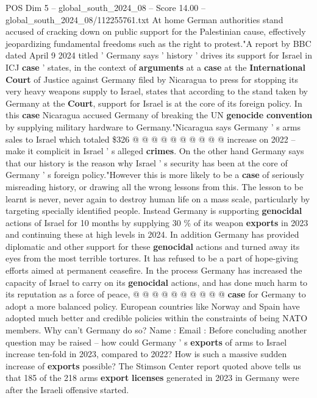 \begin{textsample}{POS Dim 5 – global\_south\_2024\_08 – Score 14.00 – global\_south\_2024\_08/112255761.txt}
At home German authorities stand accused of cracking down on public support for the Palestinian cause, effectively jeopardizing fundamental freedoms such as the right to protest."A report by BBC dated April 9 2024 titled ' Germany says ' history ' drives its support for Israel in ICJ \textbf{case} ' states, in the context of \textbf{arguments} at a \textbf{case} at the \textbf{International} \textbf{Court} of Justice against Germany filed by Nicaragua to press for stopping its very heavy weapons supply to Israel, states that according to the stand taken by Germany at the \textbf{Court}, support for Israel is at the core of its foreign policy.
In this \textbf{case} Nicaragua accused Germany of breaking the UN \textbf{genocide} \textbf{convention} by supplying military hardware to Germany."Nicaragua says Germany ' s arms sales to Israel which totaled \$326 @ @ @ @ @ @ @ @ @ @ increase on 2022 -- make it complicit in Israel ' s alleged \textbf{crimes}.
On the other hand Germany says that our history is the reason why Israel ' s security has been at the core of Germany ' s foreign policy."However this is more likely to be a \textbf{case} of seriously misreading history, or drawing all the wrong lessons from this.
The lesson to be learnt is never, never again to destroy human life on a mass scale, particularly by targeting specially identified people.
Instead Germany is supporting \textbf{genocidal} actions of Israel for 10 months by supplying 30 \% of its weapon \textbf{exports} in 2023 and continuing these at high levels in 2024.
In addition Germany has provided diplomatic and other support for these \textbf{genocidal} actions and turned away its eyes from the most terrible tortures.
It has refused to be a part of hope-giving efforts aimed at permanent ceasefire.
In the process Germany has increased the capacity of Israel to carry on its \textbf{genocidal} actions, and has done much harm to its reputation as a force of peace, @ @ @ @ @ @ @ @ @ @ \textbf{case} for Germany to adopt a more balanced policy.
European countries like Norway and Spain have adopted much better and credible policies within the constraints of being NATO members.
Why can't Germany do so?
Name : Email : Before concluding another question may be raised -- how could Germany ' s \textbf{exports} of arms to Israel increase ten-fold in 2023, compared to 2022?
How is such a massive sudden increase of \textbf{exports} possible?
The Stimson Center report quoted above tells us that 185 of the 218 arms \textbf{export} \textbf{licenses} generated in 2023 in Germany were after the Israeli offensive started.

\end{textsample}
